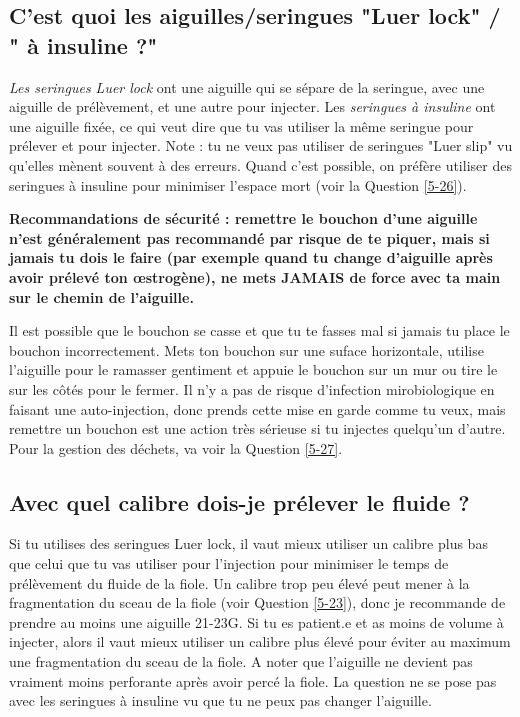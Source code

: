 \documentclass{article}
\begin{document}
\subsection{C'est quoi les aiguilles/seringues "Luer lock" / " à insuline ?"}\label{5-13}

\textit{Les seringues Luer lock} ont une aiguille qui se sépare de la seringue, avec une aiguille de prélèvement, et une autre pour injecter. Les \textit{seringues à insuline} ont une aiguille fixée, ce qui veut dire que tu vas utiliser la même seringue pour prélever et pour injecter. Note : tu ne veux pas utiliser de seringues "Luer slip" vu qu'elles mènent souvent à des erreurs. Quand c'est possible, on préfère utiliser des seringues à insuline pour minimiser l'espace mort (voir la Question \ref{5-26}).

\textbf{Recommandations de sécurité : remettre le bouchon d'une aiguille n'est généralement pas recommandé par risque de te piquer, mais si jamais tu dois le faire (par exemple quand tu change d'aiguille après avoir prélevé ton œstrogène), ne mets JAMAIS de force avec ta main sur le chemin de l'aiguille.}

Il est possible que le bouchon se casse et que tu te fasses mal si jamais tu place le bouchon incorrectement. Mets ton bouchon sur une suface horizontale, utilise l'aiguille pour le ramasser gentiment et appuie le bouchon sur un mur ou tire le sur les côtés pour le fermer. Il n'y a pas de risque d'infection mirobiologique en faisant une auto-injection, donc prends cette mise en garde comme tu veux, mais remettre un bouchon est une action très sérieuse si tu injectes quelqu'un d'autre. Pour la gestion des déchets, va voir la Question \ref{5-27}.

\subsection{Avec quel calibre dois-je prélever le fluide ?}

Si tu utilises des seringues Luer lock, il vaut mieux utiliser un calibre plus bas que celui que tu vas utiliser pour l'injection pour minimiser le temps de prélèvement du fluide de la fiole. Un calibre trop peu élevé peut mener à la fragmentation du sceau de la fiole (voir Question \ref{5-23}), donc je recommande de prendre au moins une aiguille 21-23G. Si tu es patient.e et as moins de volume à injecter, alors il vaut mieux utiliser un calibre plus élevé pour éviter au maximum une fragmentation du sceau de la fiole. A noter que l'aiguille ne devient pas vraiment moins perforante après avoir percé la fiole. La question ne se pose pas avec les seringues à insuline vu que tu ne peux pas changer l'aiguille.
\end{document}
